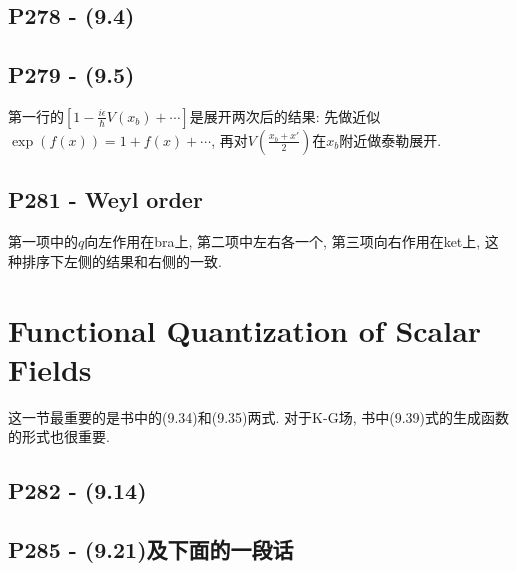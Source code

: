 \documentclass[10pt,b5paper,openany]{book}
\begin{document}
\subsection{P278 - (9.4)}

\begin{center}
\end{center}

\subsection{P279 - (9.5)}

第一行的$[1-\frac{i\epsilon}{\hbar}V(x_b)+\cdots]$是展开两次后的结果: 先做近似$\exp(f(x)) = 1 + f(x) + \cdots$, 再对$V(\frac{x_b + x'}{2})$在$x_b$附近做泰勒展开.  

\subsection{P281 - Weyl order}

第一项中的$q$向左作用在bra上, 第二项中左右各一个, 第三项向右作用在ket上, 这种排序下左侧的结果和右侧的一致. 

\section{Functional Quantization of Scalar Fields}

这一节最重要的是书中的(9.34)和(9.35)两式. 对于K-G场, 书中(9.39)式的生成函数的形式也很重要. 

\subsection{P282 - (9.14)}

\begin{center}
\end{center}

\subsection{P285 - (9.21)及下面的一段话}
\end{document}
